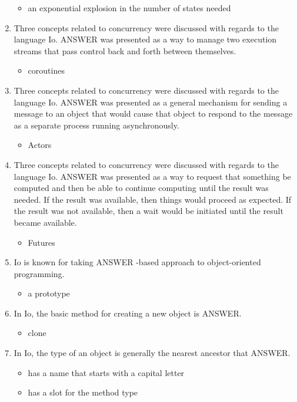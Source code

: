 \documentclass{exam}
\begin{document}
\begin{enumerate}
\begin{itemize}
\item an exponential explosion in the number of states needed
\end{itemize}
\item Three concepts related to concurrency were discussed with regards to the language Io.  ANSWER was presented as a way to manage two execution streams that pass control back and forth between themselves.
\begin{itemize}
\item coroutines
\end{itemize}
\item Three concepts related to concurrency were discussed with regards to the language Io.  ANSWER was presented as a general mechanism for sending a message to an object that would cause that object to respond to the message as a separate process running asynchronously.
\begin{itemize}
\item Actors
\end{itemize}
\item Three concepts related to concurrency were discussed with regards to the language Io.  ANSWER was presented as a way to request that something be computed and then be able to continue computing until the result was needed.  If the result was available, then things would proceed as expected.  If the result was not available, then a wait would be initiated until the result became available.
\begin{itemize}
\item Futures
\end{itemize}
\item Io is known for taking ANSWER -based approach to object-oriented programming.
\begin{itemize}
\item a prototype
\end{itemize}
\item In Io, the basic method for creating a new object is ANSWER.
\begin{itemize}
\item clone
\end{itemize}
\item In Io, the type of an object is generally the nearest ancestor that ANSWER.
\begin{itemize}
\item has a name that starts with a capital letter
\item has a slot for the method type

\end{itemize}
\end{enumerate}
\end{document}
